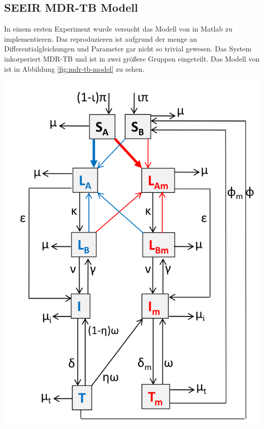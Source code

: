 \documentclass[paper=a4, fontsize=11pt, ngerman, abstract=on]{scrartcl}
\numberwithin{equation}{section} %
\numberwithin{figure}{section} %
\numberwithin{table}{section} %
\begin{document}
\subsection{SEEIR MDR-TB Modell}

In einem ersten Experiment wurde versucht das Modell von \cite{Trauer2014} in Matlab zu implementieren. Das reproduzieren  ist aufgrund der menge an Differentialgleichungen und Parameter gar nicht so trivial gewesen. Das System inkorperiert MDR-TB und ist in zwei größere Gruppen eingeteilt. Das Modell von \cite{Trauer2014} ist in Abbildung \ref{fig:mdr-tb-model} zu sehen.

\begin{minipage}{0.4\linewidth}
  \includegraphics[width=\linewidth]{images/mdr_tb_model}
  \label{fig:mdr-tb-model}
\end{minipage}\hfill
\end{document}
